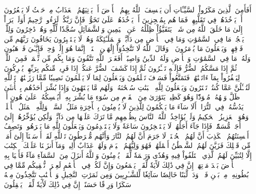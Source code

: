 أَفَأَمِنَ ٱلَّذِينَ مَكَرُواْ ٱلسَّيِّـَٔاتِ أَن يَخۡسِفَ ٱللَّهُ بِهِمُ ٱلۡأَرۡضَ أَوۡ يَأۡتِيَهُمُ ٱلۡعَذَابُ مِنۡ حَيۡثُ لَا يَشۡعُرُونَ
أَوۡ يَأۡخُذَهُمۡ فِي تَقَلُّبِهِمۡ فَمَا هُم بِمُعۡجِزِينَ
أَوۡ يَأۡخُذَهُمۡ عَلَىٰ تَخَوُّفٖ فَإِنَّ رَبَّكُمۡ لَرَءُوفٞ رَّحِيمٌ
أَوَلَمۡ يَرَوۡاْ إِلَىٰ مَا خَلَقَ ٱللَّهُ مِن شَيۡءٖ يَتَفَيَّؤُاْ ظِلَٰلُهُۥ عَنِ ٱلۡيَمِينِ وَٱلشَّمَآئِلِ سُجَّدٗا لِّلَّهِ وَهُمۡ دَٰخِرُونَ
وَلِلَّهِۤ يَسۡجُدُۤ مَا فِي ٱلسَّمَٰوَٰتِ وَمَا فِي ٱلۡأَرۡضِ مِن دَآبَّةٖ وَٱلۡمَلَـٰٓئِكَةُ وَهُمۡ لَا يَسۡتَكۡبِرُونَ
يَخَافُونَ رَبَّهُم مِّن فَوۡقِهِمۡ وَيَفۡعَلُونَ مَا يُؤۡمَرُونَ۩
۞وَقَالَ ٱللَّهُ لَا تَتَّخِذُوٓاْ إِلَٰهَيۡنِ ٱثۡنَيۡنِۖ إِنَّمَا هُوَ إِلَٰهٞ وَٰحِدٞ فَإِيَّـٰيَ فَٱرۡهَبُونِ
وَلَهُۥ مَا فِي ٱلسَّمَٰوَٰتِ وَٱلۡأَرۡضِ وَلَهُ ٱلدِّينُ وَاصِبًاۚ أَفَغَيۡرَ ٱللَّهِ تَتَّقُونَ
وَمَا بِكُم مِّن نِّعۡمَةٖ فَمِنَ ٱللَّهِۖ ثُمَّ إِذَا مَسَّكُمُ ٱلضُّرُّ فَإِلَيۡهِ تَجۡـَٔرُونَ
ثُمَّ إِذَا كَشَفَ ٱلضُّرَّ عَنكُمۡ إِذَا فَرِيقٞ مِّنكُم بِرَبِّهِمۡ يُشۡرِكُونَ
لِيَكۡفُرُواْ بِمَآ ءَاتَيۡنَٰهُمۡۚ فَتَمَتَّعُواْ فَسَوۡفَ تَعۡلَمُونَ
وَيَجۡعَلُونَ لِمَا لَا يَعۡلَمُونَ نَصِيبٗا مِّمَّا رَزَقۡنَٰهُمۡۗ تَٱللَّهِ لَتُسۡـَٔلُنَّ عَمَّا كُنتُمۡ تَفۡتَرُونَ
وَيَجۡعَلُونَ لِلَّهِ ٱلۡبَنَٰتِ سُبۡحَٰنَهُۥ وَلَهُم مَّا يَشۡتَهُونَ
وَإِذَا بُشِّرَ أَحَدُهُم بِٱلۡأُنثَىٰ ظَلَّ وَجۡهُهُۥ مُسۡوَدّٗا وَهُوَ كَظِيمٞ
يَتَوَٰرَىٰ مِنَ ٱلۡقَوۡمِ مِن سُوٓءِ مَا بُشِّرَ بِهِۦٓۚ أَيُمۡسِكُهُۥ عَلَىٰ هُونٍ أَمۡ يَدُسُّهُۥ فِي ٱلتُّرَابِۗ أَلَا سَآءَ مَا يَحۡكُمُونَ
لِلَّذِينَ لَا يُؤۡمِنُونَ بِٱلۡأٓخِرَةِ مَثَلُ ٱلسَّوۡءِۖ وَلِلَّهِ ٱلۡمَثَلُ ٱلۡأَعۡلَىٰۚ وَهُوَ ٱلۡعَزِيزُ ٱلۡحَكِيمُ
وَلَوۡ يُؤَاخِذُ ٱللَّهُ ٱلنَّاسَ بِظُلۡمِهِم مَّا تَرَكَ عَلَيۡهَا مِن دَآبَّةٖ وَلَٰكِن يُؤَخِّرُهُمۡ إِلَىٰٓ أَجَلٖ مُّسَمّٗىۖ فَإِذَا جَآءَ أَجَلُهُمۡ لَا يَسۡتَـٔۡخِرُونَ سَاعَةٗ وَلَا يَسۡتَقۡدِمُونَ
وَيَجۡعَلُونَ لِلَّهِ مَا يَكۡرَهُونَۚ وَتَصِفُ أَلۡسِنَتُهُمُ ٱلۡكَذِبَ أَنَّ لَهُمُ ٱلۡحُسۡنَىٰۚ لَا جَرَمَ أَنَّ لَهُمُ ٱلنَّارَ وَأَنَّهُم مُّفۡرَطُونَ
تَٱللَّهِ لَقَدۡ أَرۡسَلۡنَآ إِلَىٰٓ أُمَمٖ مِّن قَبۡلِكَ فَزَيَّنَ لَهُمُ ٱلشَّيۡطَٰنُ أَعۡمَٰلَهُمۡ فَهُوَ وَلِيُّهُمُ ٱلۡيَوۡمَ وَلَهُمۡ عَذَابٌ أَلِيمٞ
وَمَآ أَنزَلۡنَا عَلَيۡكَ ٱلۡكِتَٰبَ إِلَّا لِتُبَيِّنَ لَهُمُ ٱلَّذِي ٱخۡتَلَفُواْ فِيهِ وَهُدٗى وَرَحۡمَةٗ لِّقَوۡمٖ يُؤۡمِنُونَ
وَٱللَّهُ أَنزَلَ مِنَ ٱلسَّمَآءِ مَآءٗ فَأَحۡيَا بِهِ ٱلۡأَرۡضَ بَعۡدَ مَوۡتِهَآۚ إِنَّ فِي ذَٰلِكَ لَأٓيَةٗ لِّقَوۡمٖ يَسۡمَعُونَ
وَإِنَّ لَكُمۡ فِي ٱلۡأَنۡعَٰمِ لَعِبۡرَةٗۖ نُّسۡقِيكُم مِّمَّا فِي بُطُونِهِۦ مِنۢ بَيۡنِ فَرۡثٖ وَدَمٖ لَّبَنًا خَالِصٗا سَآئِغٗا لِّلشَّـٰرِبِينَ
وَمِن ثَمَرَٰتِ ٱلنَّخِيلِ وَٱلۡأَعۡنَٰبِ تَتَّخِذُونَ مِنۡهُ سَكَرٗا وَرِزۡقًا حَسَنًاۚ إِنَّ فِي ذَٰلِكَ لَأٓيَةٗ لِّقَوۡمٖ يَعۡقِلُونَ

